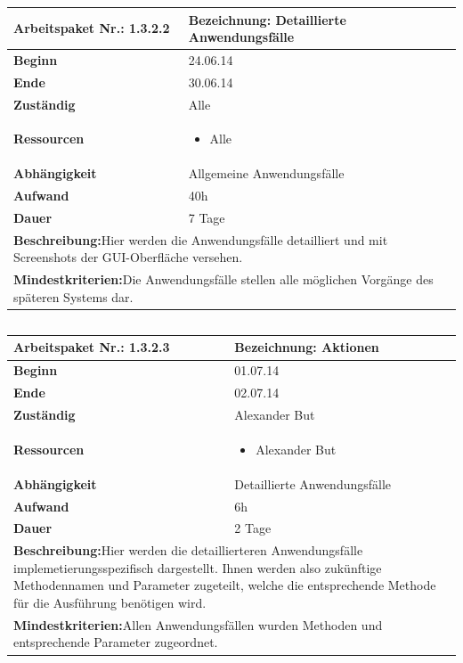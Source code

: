 \documentclass[fontsize=12pt,paper=a4,twoside]{scrartcl}
\begin{document}
\begin{tabular}{|p{5.3cm}|p{9.7cm}|}\hline
	\textbf{Arbeitspaket Nr.:} 1.3.2.2 & \textbf{Bezeichnung:} Detaillierte Anwendungsfälle\\ \hline \hline
	\textbf{Beginn} & 24.06.14\\ \hline
	\textbf{Ende} & 30.06.14\\ \hline
	\textbf{Zuständig} & Alle\\ \hline
	\textbf{Ressourcen} & \begin{itemize}
		\item Alle
	\end{itemize}    \\ \hline
	\textbf{Abhängigkeit} & Allgemeine Anwendungsfälle\\ \hline
	\textbf{Aufwand} & 40h\\ \hline
	\textbf{Dauer} & 7 Tage\\ \hline
	\multicolumn{2}{|p{15cm}|}{\textbf{Beschreibung:}\newline Hier werden die Anwendungsfälle detailliert und mit Screenshots der GUI-Oberfläche versehen. }\\ \hline
	\multicolumn{2}{|p{15cm}|}{\textbf{Mindestkriterien:}\newline Die Anwendungsfälle stellen alle möglichen Vorgänge des späteren Systems dar. }\\ \hline
\end{tabular}

\begin{verbatim} 
\end{verbatim}

\begin{tabular}{|p{5.3cm}|p{9.7cm}|}\hline
	\textbf{Arbeitspaket Nr.:} 1.3.2.3 & \textbf{Bezeichnung:} Aktionen\\ \hline \hline
	\textbf{Beginn} & 01.07.14\\ \hline
	\textbf{Ende} & 02.07.14\\ \hline
	\textbf{Zuständig} & Alexander But\\ \hline
	\textbf{Ressourcen} & \begin{itemize}
		\item Alexander But
	\end{itemize}    \\ \hline
	\textbf{Abhängigkeit} & Detaillierte Anwendungsfälle\\ \hline
	\textbf{Aufwand} & 6h\\ \hline
	\textbf{Dauer} & 2 Tage\\ \hline
	\multicolumn{2}{|p{15cm}|}{\textbf{Beschreibung:}\newline Hier werden die detaillierteren Anwendungsfälle implemetierungsspezifisch dargestellt. Ihnen werden also zukünftige Methodennamen und Parameter zugeteilt, welche die entsprechende Methode für die Ausführung benötigen wird.  }\\ \hline
	\multicolumn{2}{|p{15cm}|}{\textbf{Mindestkriterien:}\newline  Allen Anwendungsfällen wurden Methoden und entsprechende Parameter zugeordnet. }\\ \hline
\end{tabular}
\end{document}
